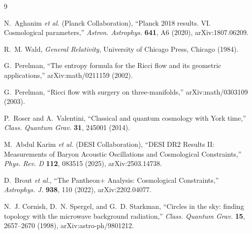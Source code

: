 \documentclass[11pt,a4paper]{article}
\begin{document}
\begin{thebibliography}{9}

N.~Aghanim \textit{et al.} (Planck Collaboration),
``Planck 2018 results. VI. Cosmological parameters,''
\emph{Astron. Astrophys.} \textbf{641}, A6 (2020), arXiv:1807.06209.

R.~M. Wald,
\emph{General Relativity}, University of Chicago Press, Chicago (1984).

G.~Perelman,
``The entropy formula for the Ricci flow and its geometric applications,''
arXiv:math/0211159 (2002).

G.~Perelman,
``Ricci flow with surgery on three-manifolds,''
arXiv:math/0303109 (2003).

P.~Roser and A.~Valentini,
``Classical and quantum cosmology with York time,''
\emph{Class. Quantum Grav.} \textbf{31}, 245001 (2014).


M.~Abdul Karim \textit{et al.} (DESI Collaboration),
``DESI DR2 Results II: Measurements of Baryon Acoustic Oscillations and Cosmological Constraints,''
\emph{Phys. Rev. D} \textbf{112}, 083515 (2025), arXiv:2503.14738.

D.~Brout \textit{et al.},
``The Pantheon+ Analysis: Cosmological Constraints,''
\emph{Astrophys. J.} \textbf{938}, 110 (2022), arXiv:2202.04077.

N.~J. Cornish, D.~N. Spergel, and G.~D. Starkman,
``Circles in the sky: finding topology with the microwave background radiation,''
\emph{Class. Quantum Grav.} \textbf{15}, 2657--2670 (1998), arXiv:astro-ph/9801212.


\end{thebibliography}
\end{document}
